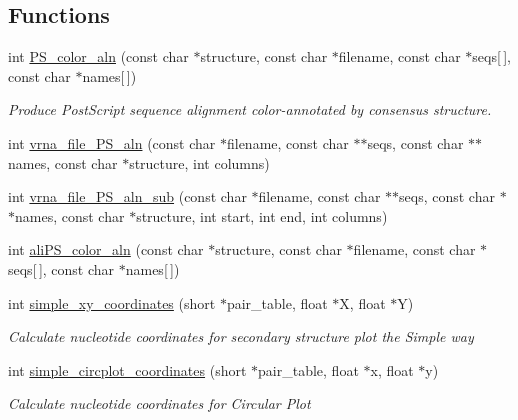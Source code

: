 \subsection*{Functions}
\begin{DoxyCompactItemize}
\item 
\mbox{\label{group__plotting__utils_ga821802c3685e37e15182341f6217470d}} 
int \hyperlink{group__plotting__utils_ga821802c3685e37e15182341f6217470d}{P\+S\+\_\+color\+\_\+aln} (const char $\ast$structure, const char $\ast$filename, const char $\ast$seqs\mbox{[}$\,$\mbox{]}, const char $\ast$names\mbox{[}$\,$\mbox{]})
\begin{DoxyCompactList}\small\item\em Produce Post\+Script sequence alignment color-\/annotated by consensus structure. \end{DoxyCompactList}\item 
int \hyperlink{group__plotting__utils_ga76b5c0637db9385a553cdd8e66e61eca}{vrna\+\_\+file\+\_\+\+P\+S\+\_\+aln} (const char $\ast$filename, const char $\ast$$\ast$seqs, const char $\ast$$\ast$names, const char $\ast$structure, int columns)
\item 
int \hyperlink{group__plotting__utils_ga2881c9b855baff948f92b93262df9ff6}{vrna\+\_\+file\+\_\+\+P\+S\+\_\+aln\+\_\+sub} (const char $\ast$filename, const char $\ast$$\ast$seqs, const char $\ast$$\ast$names, const char $\ast$structure, int start, int end, int columns)
\item 
int \hyperlink{group__plotting__utils_gaab48d4dac655d688abe921389ac2847c}{ali\+P\+S\+\_\+color\+\_\+aln} (const char $\ast$structure, const char $\ast$filename, const char $\ast$seqs\mbox{[}$\,$\mbox{]}, const char $\ast$names\mbox{[}$\,$\mbox{]})
\item 
int \hyperlink{group__plotting__utils_gaf4b9173e7d3fd361c3c85e6def194123}{simple\+\_\+xy\+\_\+coordinates} (short $\ast$pair\+\_\+table, float $\ast$X, float $\ast$Y)
\begin{DoxyCompactList}\small\item\em Calculate nucleotide coordinates for secondary structure plot the {\itshape Simple way} \end{DoxyCompactList}\item 
int \hyperlink{group__plotting__utils_gac4ea13d35308f09940178d2b05a248c2}{simple\+\_\+circplot\+\_\+coordinates} (short $\ast$pair\+\_\+table, float $\ast$x, float $\ast$y)
\begin{DoxyCompactList}\small\item\em Calculate nucleotide coordinates for {\itshape Circular Plot} \end{DoxyCompactList}\item 

\end{DoxyCompactItemize}
